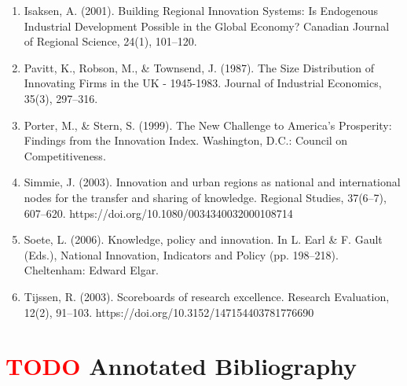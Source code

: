 \documentclass[a4paper,11pt]{article}
\begin{document}
\begin{enumerate}
\item Isaksen, A. (2001). Building Regional Innovation Systems: Is Endogenous Industrial Development Possible in the Global Economy? Canadian Journal of Regional Science, 24(1), 101–120.
\item Pavitt, K., Robson, M., \& Townsend, J. (1987). The Size Distribution of Innovating Firms in the UK - 1945-1983. Journal of Industrial Economics, 35(3), 297–316.
\item Porter, M., \& Stern, S. (1999). The New Challenge to America’s Prosperity: Findings from the Innovation Index. Washington, D.C.: Council on Competitiveness.
\item Simmie, J. (2003). Innovation and urban regions as national and international nodes for the transfer and sharing of knowledge. Regional Studies, 37(6–7), 607–620. https://doi.org/10.1080/0034340032000108714
\item Soete, L. (2006). Knowledge, policy and innovation. In L. Earl \& F. Gault (Eds.), National Innovation, Indicators and Policy (pp. 198–218). Cheltenham: Edward Elgar.
\item Tijssen, R. (2003). Scoreboards of research excellence. Research Evaluation, 12(2), 91–103. https://doi.org/10.3152/147154403781776690
\end{enumerate}

\section{\textcolor{red}{TODO} Annotated Bibliography}
\label{annotated_bib}
\end{document}
